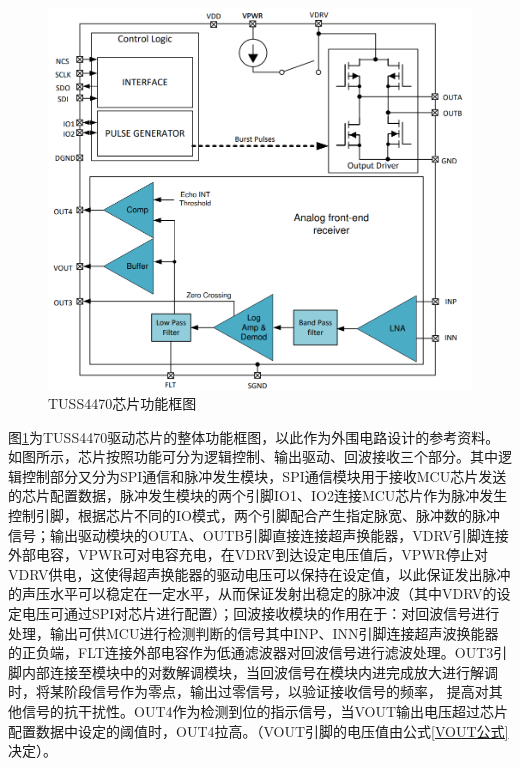 \begin{figure}[ht]
	\centering
	\includegraphics[width=12cm]{figure/Function Block Diagram.png}
	\caption{TUSS4470芯片功能框图}
	\label{TUSS4470芯片功能框图}%
\end{figure}
图\ref{TUSS4470芯片功能框图}为TUSS4470驱动芯片的整体功能框图，以此作为外围电路设计的参考资料。如图所示，芯片按照功能可分为逻辑控制、输出驱动、回波接收三个部分。其中逻辑控制部分又分为SPI通信和脉冲发生模块，SPI通信模块用于接收MCU芯片发送的芯片配置数据，脉冲发生模块的两个引脚IO1、IO2连接MCU芯片作为脉冲发生控制引脚，根据芯片不同的IO模式，两个引脚配合产生指定脉宽、脉冲数的脉冲信号；输出驱动模块的OUTA、OUTB引脚直接连接超声换能器，VDRV引脚连接外部电容，VPWR可对电容充电，在VDRV到达设定电压值后，VPWR停止对VDRV供电，这使得超声换能器的驱动电压可以保持在设定值，以此保证发出脉冲的声压水平可以稳定在一定水平，从而保证发射出稳定的脉冲波（其中VDRV的设定电压可通过SPI对芯片进行配置）；回波接收模块的作用在于：对回波信号进行处理，输出可供MCU进行检测判断的信号其中INP、INN引脚连接超声波换能器的正负端，FLT连接外部电容作为低通滤波器对回波信号进行滤波处理。OUT3引脚内部连接至模块中的对数解调模块，当回波信号在模块内进完成放大进行解调时，将某阶段信号作为零点，输出过零信号，以验证接收信号的频率， 提高对其他信号的抗干扰性。OUT4作为检测到位的指示信号，当VOUT输出电压超过芯片配置数据中设定的阈值时，OUT4拉高。（VOUT引脚的电压值由公式\ref{VOUT公式}决定）。

